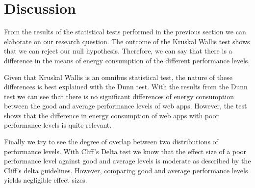 \section{Discussion}
From the results of the statistical tests performed in the previous section we can elaborate on our research question. 
The outcome of the Kruskal Wallis test shows that we can reject our null hypothesis. Therefore, we can say that there is a difference in the means of energy consumption of the different performance levels. \newline

Given that Kruskal Wallis is an omnibus statistical test, the nature of these differences is best explained with the Dunn test. With the results from the Dunn test we can see that there is no significant differences of energy consumption between the good and average performance levels of web apps. However, the test shows that the difference in energy consumption of web apps with poor performance levels is quite relevant.
\newline

Finally we try to see the degree of overlap between two distributions of performance levels. With Cliff's Delta test we know that the effect size of a poor performance level against good and average levels is moderate as described by the Cliff's delta guidelines. However, comparing good and average performance levels yields negligible effect sizes. 
\newline

\newline

\newline



